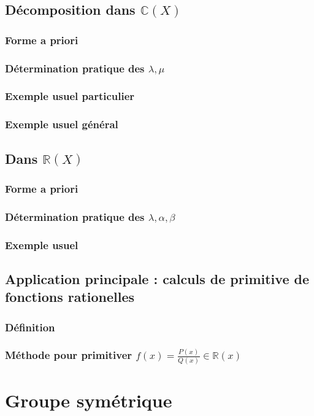 \documentclass[12pt,a4paper,french]{book}
\begin{document}
	\section{Décomposition dans $\mathbb{C}(X)$}
		\subsection{Forme a priori}
		\subsection{Détermination pratique des $\lambda,\mu$}
		\subsection{Exemple usuel particulier}
		\subsection{Exemple usuel général}
	\section{Dans $\mathbb{R}(X)$}
		\subsection{Forme a priori}
		\subsection{Détermination pratique des $\lambda,\alpha,\beta$}
		\subsection{Exemple usuel}
	\section{Application principale : calculs de primitive de fonctions rationelles}
		\subsection{Définition}
		\subsection{Méthode pour primitiver $f(x)=\frac{P(x)}{Q(x)} \in \mathbb{R}(x)$}
		
\chapter{Groupe symétrique}
\end{document}
